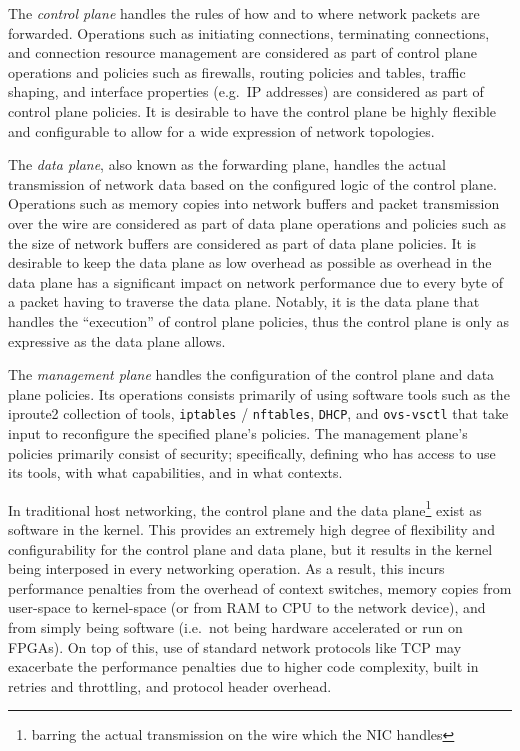 \documentclass[12pt,titlepage]{article}
\begin{document}
The \textit{control plane} handles the rules of how and to where network packets are forwarded.
Operations such as initiating connections, terminating connections, and connection resource management are considered as part of control plane operations and policies such as firewalls, routing policies and tables, traffic shaping, and interface properties (e.g.\ IP addresses) are considered as part of control plane policies.
It is desirable to have the control plane be highly flexible and configurable to allow for a wide expression of network topologies.

The \textit{data plane}, also known as the forwarding plane, handles the actual transmission of network data based on the configured logic of the control plane.
Operations such as memory copies into network buffers and packet transmission over the wire are considered as part of data plane operations and policies such as the size of network buffers are considered as part of data plane policies.
It is desirable to keep the data plane as low overhead as possible as overhead in the data plane has a significant impact on network performance due to every byte of a packet having to traverse the data plane.
Notably, it is the data plane that handles the ``execution'' of control plane policies, thus the control plane is only as expressive as the data plane allows.

The \textit{management plane} handles the configuration of the control plane and data plane policies.
Its operations consists primarily of using software tools such as the iproute2 collection of tools, \texttt{iptables} / \texttt{nftables}, \texttt{DHCP}, and \texttt{ovs-vsctl} that take input to reconfigure the specified plane's policies.
The management plane's policies primarily consist of security; specifically, defining who has access to use its tools, with what capabilities, and in what contexts.


In traditional host networking, the control plane and the data plane\footnote{barring the actual transmission on the wire which the NIC handles} exist as software in the kernel.
This provides an extremely high degree of flexibility and configurability for the control plane and data plane, but it results in the kernel being interposed in every networking operation.
As a result, this incurs performance penalties from the overhead of context switches, memory copies from user-space to kernel-space (or from RAM to CPU to the network device), and from simply being software (i.e.\ not being hardware accelerated or run on FPGAs).
On top of this, use of standard network protocols like TCP may exacerbate the performance penalties due to higher code complexity, built in retries and throttling, and protocol header overhead.
\end{document}
